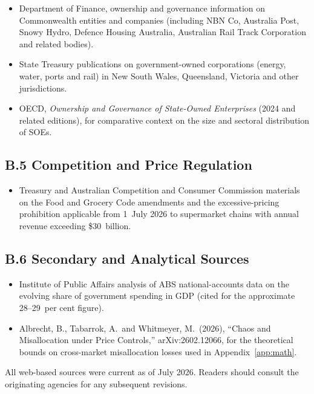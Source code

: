 \documentclass[12pt,anyside]{book}
\theoremstyle{definition}
\theoremstyle{plain}
\theoremstyle{remark}
\begin{document}
\begin{itemize}
\item Department of Finance, ownership and governance information on Commonwealth entities and companies (including NBN Co, Australia Post, Snowy Hydro, Defence Housing Australia, Australian Rail Track Corporation and related bodies).

\item State Treasury publications on government-owned corporations (energy, water, ports and rail) in New South Wales, Queensland, Victoria and other jurisdictions.

\item OECD, \textit{Ownership and Governance of State-Owned Enterprises} (2024 and related editions), for comparative context on the size and sectoral distribution of SOEs.
\end{itemize}

\subsection*{B.5 Competition and Price Regulation}

\begin{itemize}
\item Treasury and Australian Competition and Consumer Commission materials on the Food and Grocery Code amendments and the excessive-pricing prohibition applicable from 1~July 2026 to supermarket chains with annual revenue exceeding \$30~billion.
\end{itemize}

\subsection*{B.6 Secondary and Analytical Sources}

\begin{itemize}
\item Institute of Public Affairs analysis of ABS national-accounts data on the evolving share of government spending in GDP (cited for the approximate 28--29~per cent figure).

\item Albrecht, B., Tabarrok, A.\ and Whitmeyer, M.\ (2026), ``Chaos and Misallocation under Price Controls,'' arXiv:2602.12066, for the theoretical bounds on cross-market misallocation losses used in Appendix~\ref{app:math}.
\end{itemize}

All web-based sources were current as of July 2026. Readers should consult the originating agencies for any subsequent revisions.
\end{document}
